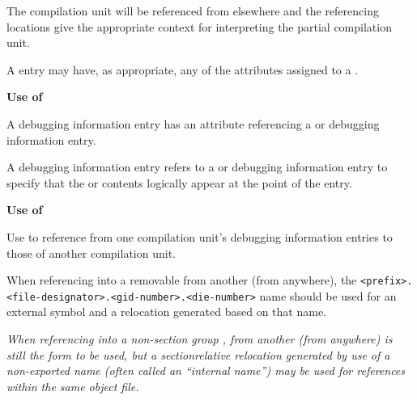 The  compilation unit will be referenced
from elsewhere and the referencing locations give the
appropriate context for interpreting the partial compilation
unit.

A  entry may have, as appropriate, any of
the attributes assigned to a .


\textbf{Use of }

A  debugging information entry has an
 attribute referencing a  or
 debugging information entry.

A  debugging information entry refers
to a 
 or 
 debugging
information entry to specify that the 
 or
 contents logically appear at the point
of the 
 entry.


\textbf{Use of }

Use 
 to reference from one compilation
unit's debugging information entries to those of another
compilation unit.

When referencing into a removable 
from another  (from anywhere), the
\texttt{<prefix>.<file-designator>.<gid-number>.<die-number>}
name should be used for an external symbol and a relocation
generated based on that name.

\textit{When referencing into a 
non-section group 
,
from another  (from anywhere) 
 is
still the form to be used, but a section\dash relative relocation
generated by use of a non-exported name (often called an
``internal name'') may be used for references within the
same object file.}

